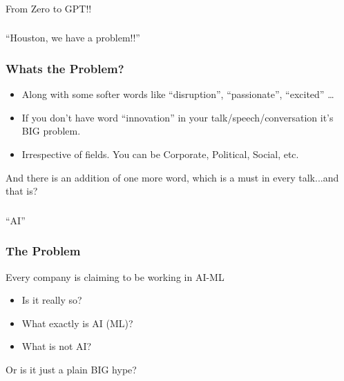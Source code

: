 \begin{frame}[fragile]\frametitle{}
\begin{center}
{\Large From Zero to GPT!!}
\end{center}
\end{frame}

\begin{frame}[fragile]\frametitle{}
\begin{center}
{\Large ``Houston, we have a problem!!''}
\end{center}
\end{frame}

\begin{frame}[fragile]\frametitle{Whats the Problem?}
\begin{itemize}
\item Along with some softer words like ``disruption'', ``passionate'', ``excited'' \ldots
\item If you don't have word ``innovation'' in your talk/speech/conversation it's  BIG problem. 
\item Irrespective of fields. You can be Corporate, Political, Social, etc.
\end{itemize}


And there is an addition of one more word,  which is a must in every talk...and that is?


\end{frame}

\begin{frame}[fragile]\frametitle{}
\begin{center}
{\Large ``AI''}
\end{center}
\end{frame}


\begin{frame}[fragile]\frametitle{The Problem}
Every company is claiming to be working in AI-ML
\begin{itemize}
\item Is it really so?
\item What exactly is AI (ML)?
\item What is not AI?
\end{itemize}
Or is it just a plain BIG hype?
\end{frame}


